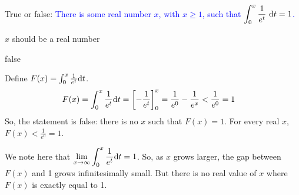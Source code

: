 


\begin{question}
True or false:
\textcolor{blue}{There is some real number $x$, with $x \geq 1$, such that $\displaystyle\int_0^x \frac{1}{e^t}~\mathrm{d}t = 1$. }
\end{question}
\begin{hint}
$x$ should be a real number
\end{hint}
\begin{answer}
false
\end{answer}
\begin{solution}
Define $F(x)=
\int_0^x \frac{1}{e^{t}}\mathrm{d}t$.
\begin{align*}
F(x)=\int_0^x \frac{1}{e^{t}}\mathrm{d}t&=\left[-\frac{1}{e^{t}}\right]_0^x
 = \frac{1}{e^0}-\frac{1}{e^{x}}<\frac{1}{e^0}=1
\end{align*}
So, the statement is false: there is no $x$ such that $F(x)=1$. For every real $x$, $F(x) < \frac{1}{e^0}=1$.

We note here that $\displaystyle\lim_{x \to \infty} \int_0^x\frac{1}{e^{t}}\mathrm{d}t=1$. So, as $x$ grows larger, the gap between $F(x)$ and 1 grows infinitesimally small. But there is no real value of $x$ where $F(x)$ is exactly equal to 1.

\end{solution}


